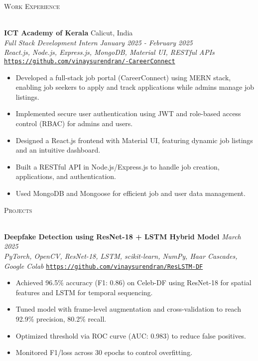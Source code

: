 \documentclass[letterpaper]{article}
\newcommand{\lineunder} {
    \vspace*{-8pt} \\
    \hspace*{-18pt} \hrulefill \\
}
\newcommand{\header} [1] {
    {\hspace*{-18pt}\vspace*{6pt} \textsc{#1}}
    \vspace*{-6pt} \lineunder
}
\begin{document}
\header{Work Experience}
\vspace{1mm}

    \textbf{ICT Academy of Kerala} \hfill Calicut, India\\
    \textit{Full Stack Development Intern} \hfill \textsl{January 2025 - February 2025}\\
    \textsl{React.js, Node.js, Express.js, MongoDB, Material UI, RESTful APIs} \hfill \texttt{\href{https://github.com/vinaysurendran/-CareerConnect}{https://github.com/vinaysurendran/-CareerConnect}} \\
    \vspace{-7pt}
    \begin{itemize} \itemsep -1mm
        \item Developed a full-stack job portal (CareerConnect) using MERN stack, enabling job seekers to apply and track applications while admins manage job listings.
        \item Implemented secure user authentication using JWT and role-based access control (RBAC) for admins and users.
        \item Designed a React.js frontend with Material UI, featuring dynamic job listings and an intuitive dashboard.
        \item Built a RESTful API in Node.js/Express.js to handle job creation, applications, and authentication.
        \item Used MongoDB and Mongoose for efficient job and user data management.
    \end{itemize}
    \vspace{-2mm}

\header{Projects}
\vspace{1mm}

    \textbf{Deepfake Detection using ResNet-18 + LSTM Hybrid Model} \hfill \textsl{March 2025} \\
    \textsl{PyTorch, OpenCV, ResNet-18, LSTM, scikit-learn, NumPy, Haar Cascades, Google Colab} \hfill \texttt{\href{https://github.com/vinaysurendran/ResLSTM-DF}{https://github.com/vinaysurendran/ResLSTM-DF}} \\
    \vspace{-2mm}
    \begin{itemize} \itemsep -1mm
        \item Achieved 96.5\% accuracy (F1: 0.86) on Celeb-DF using ResNet-18 for spatial features and LSTM for temporal sequencing.
        \item Tuned model with frame-level augmentation and cross-validation to reach 92.9\% precision, 80.2\% recall.
        \item Optimized threshold via ROC curve (AUC: 0.983) to reduce false positives.
        \item Monitored F1/loss across 30 epochs to control overfitting.
    \end{itemize}
    \vspace{-1mm}
\end{document}
